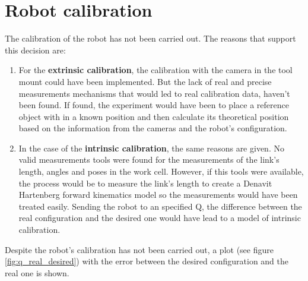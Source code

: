\section{Robot calibration} %
\label{sec:robot_calibration}
The calibration of the robot has not been carried out. The reasons that support this decision are:
\begin{enumerate}
	\item For the \textbf{extrinsic calibration}, the calibration with the camera in the tool mount could have been implemented. But the lack of real and precise measurements mechanisms that would led to real calibration data, haven't been found. If found, the experiment would have been to place a reference object with in a known position and then calculate its theoretical position based on the information from the cameras and the robot's configuration.
	\item In the case of the \textbf{intrinsic calibration}, the same reasons are given. No valid measurements tools were found for the measurements of the link's length, angles and poses in the work cell. However, if this tools were available, the process would be to measure the link's length to create a Denavit Hartenberg forward kinematics model so the measurements would have been treated easily. Sending the robot to an specified Q, the difference between the real configuration and the desired one would have lead to a model of intrinsic calibration.
\end{enumerate}

Despite the robot's calibration has not been carried out, a plot (see figure \ref{fig:q_real_desired}) with the error between the desired configuration and the real one is shown.

